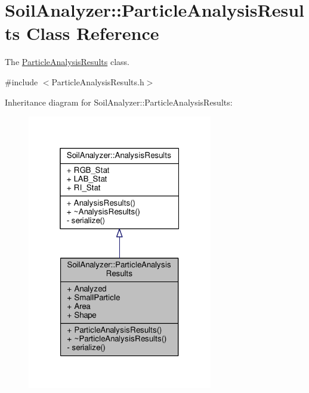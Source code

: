 \hypertarget{class_soil_analyzer_1_1_particle_analysis_results}{}\section{Soil\+Analyzer\+:\+:Particle\+Analysis\+Results Class Reference}
\label{class_soil_analyzer_1_1_particle_analysis_results}


The \hyperlink{class_soil_analyzer_1_1_particle_analysis_results}{Particle\+Analysis\+Results} class.  




{\ttfamily \#include $<$Particle\+Analysis\+Results.\+h$>$}



Inheritance diagram for Soil\+Analyzer\+:\+:Particle\+Analysis\+Results\+:\nopagebreak
\begin{figure}[H]
\begin{center}
\leavevmode
\includegraphics[width=229pt]{class_soil_analyzer_1_1_particle_analysis_results__inherit__graph}
\end{center}
\end{figure}


